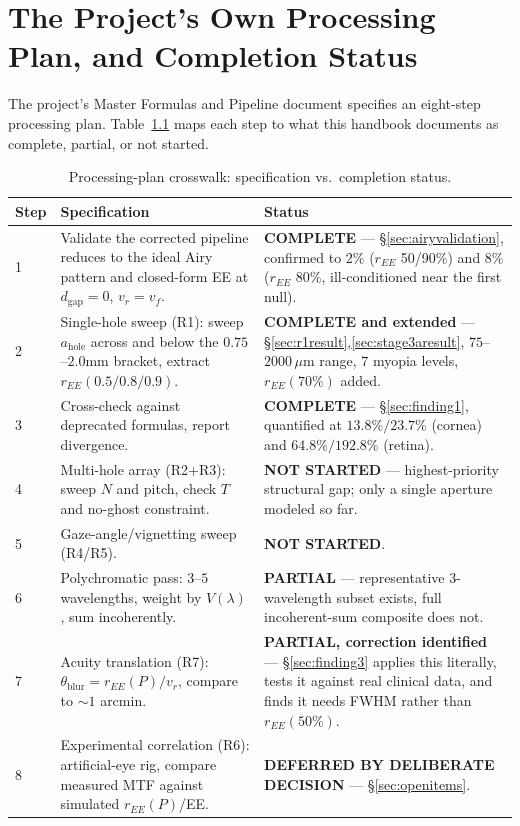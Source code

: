 \documentclass[11pt]{report}
\newcommand{\ahole}{a_{\text{hole}}}
\newcommand{\dgap}{d_{\text{gap}}}
\newcommand{\vr}{v_r}
\newcommand{\vf}{v_f}
\begin{document}
\chapter{The Project's Own Processing Plan, and Completion Status}
\label{ch:processingplan}
The project's Master Formulas and Pipeline document specifies an eight-step processing plan. Table~\ref{tab:processingplan} maps each step to what this handbook documents as complete, partial, or not started.

\begin{longtable}{p{0.7cm}p{6.3cm}p{7.5cm}}
\caption{Processing-plan crosswalk: specification vs.\ completion status.}
\label{tab:processingplan}\\
\toprule
\textbf{Step} & \textbf{Specification} & \textbf{Status} \\
\midrule
\endhead
1 & Validate the corrected pipeline reduces to the ideal Airy pattern and closed-form EE at $\dgap=0$, $\vr=\vf$. & \textbf{COMPLETE} --- \S\ref{sec:airyvalidation}, confirmed to $2\%$ ($r_{EE}$ 50/90\%) and $8\%$ ($r_{EE}$ 80\%, ill-conditioned near the first null). \\
2 & Single-hole sweep (R1): sweep $\ahole$ across and below the $0.75$--$2.0$mm bracket, extract $r_{EE}(0.5/0.8/0.9)$. & \textbf{COMPLETE and extended} --- \S\ref{sec:r1result},\ref{sec:stage3aresult}, $75$--$2000\,\mu$m range, $7$ myopia levels, $r_{EE}(70\%)$ added. \\
3 & Cross-check against deprecated formulas, report divergence. & \textbf{COMPLETE} --- \S\ref{sec:finding1}, quantified at $13.8\%/23.7\%$ (cornea) and $64.8\%/192.8\%$ (retina). \\
4 & Multi-hole array (R2+R3): sweep $N$ and pitch, check $T$ and no-ghost constraint. & \textbf{NOT STARTED} --- highest-priority structural gap; only a single aperture modeled so far. \\
5 & Gaze-angle/vignetting sweep (R4/R5). & \textbf{NOT STARTED}. \\
6 & Polychromatic pass: $3$--$5$ wavelengths, weight by $V(\lambda)$, sum incoherently. & \textbf{PARTIAL} --- representative 3-wavelength subset exists, full incoherent-sum composite does not. \\
7 & Acuity translation (R7): $\theta_{\text{blur}}=r_{EE}(P)/\vr$, compare to $\sim1$ arcmin. & \textbf{PARTIAL, correction identified} --- \S\ref{sec:finding3} applies this literally, tests it against real clinical data, and finds it needs FWHM rather than $r_{EE}(50\%)$. \\
8 & Experimental correlation (R6): artificial-eye rig, compare measured MTF against simulated $r_{EE}(P)$/EE. & \textbf{DEFERRED BY DELIBERATE DECISION} --- \S\ref{sec:openitems}. \\
\bottomrule
\end{longtable}
\end{document}
